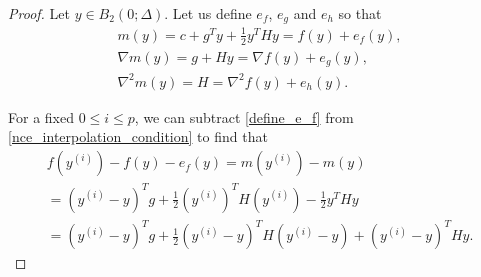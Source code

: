 \begin{proof}


Let $y \in B_2(0; \Delta)$.
Let us define $e_f$, $e_g$ and $e_h$ so that
\begin{align}
m(y) = c + g^T y + \frac 1 2 y^T H y = f(y) + e_f(y) \label{define_e_f}, \\
\nabla m(y) = g + H y = \nabla f(y) + e_g(y), \nonumber \\
\nabla^2 m(y) = H = \nabla^2 f(y) + e_h(y). \nonumber
\end{align}

For a fixed $0 \le i \le p$, we can subtract \cref{define_e_f} from \cref{nce_interpolation_condition} to find that
\begin{align}
f\left(y^{(i)}\right) - f(y) - e_f(y)
= m\left(y^{(i)}\right) - m(y) \nonumber \\
= \left(y^{(i)} - y\right)^Tg + \frac 1 2 \left(y^{(i)}\right)^T H \left(y^{(i)}\right) - \frac 1 2 y^T H y \nonumber \\
= \left(y^{(i)} - y\right)^T g  + \frac 1 2 \left(y^{(i)} - y\right)^T H \left(y^{(i)} - y\right) + \left(y^{(i)} - y\right)^TH y. \label{nec_eqn2}
\end{align}


\end{proof}
